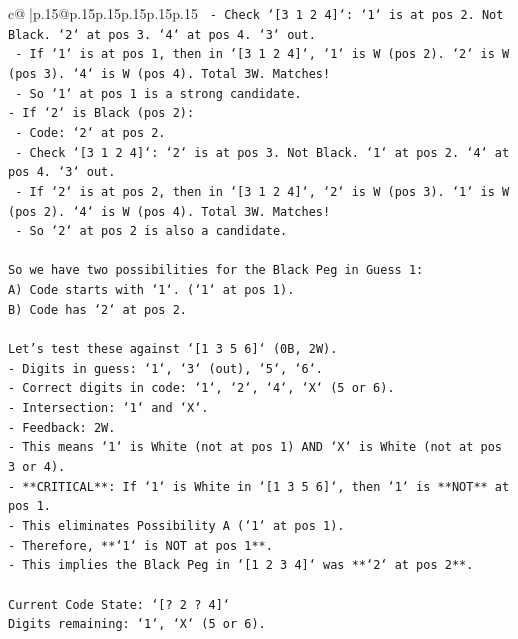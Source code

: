 \documentclass{article}
\begin{document}
{\begin{supertabular}{c@{$\;$}|p{.15\linewidth}@{}p{.15\linewidth}p{.15\linewidth}p{.15\linewidth}p{.15\linewidth}p{.15\linewidth}}
{{{\texttt{    {-} Check `{[}3 1 2 4{]}`: `1` is at pos 2. Not Black. `2` at pos 3. `4` at pos 4. `3` out.} \\
\texttt{    {-} If `1` is at pos 1, then in `{[}3 1 2 4{]}`, `1` is W (pos 2). `2` is W (pos 3). `4` is W (pos 4). Total 3W. Matches!} \\
\texttt{    {-} So `1` at pos 1 is a strong candidate.} \\
\texttt{{-} If `2` is Black (pos 2):} \\
\texttt{    {-} Code: `2` at pos 2.} \\
\texttt{    {-} Check `{[}3 1 2 4{]}`: `2` is at pos 3. Not Black. `1` at pos 2. `4` at pos 4. `3` out.} \\
\texttt{    {-} If `2` is at pos 2, then in `{[}3 1 2 4{]}`, `2` is W (pos 3). `1` is W (pos 2). `4` is W (pos 4). Total 3W. Matches!} \\
\texttt{    {-} So `2` at pos 2 is also a candidate.} \\
\\ 
\texttt{So we have two possibilities for the Black Peg in Guess 1:} \\
\texttt{A) Code starts with `1`. (`1` at pos 1).} \\
\texttt{B) Code has `2` at pos 2.} \\
\\ 
\texttt{Let's test these against `{[}1 3 5 6{]}` (0B, 2W).} \\
\texttt{{-} Digits in guess: `1`, `3` (out), `5`, `6`.} \\
\texttt{{-} Correct digits in code: `1`, `2`, `4`, `X` (5 or 6).} \\
\texttt{{-} Intersection: `1` and `X`.} \\
\texttt{{-} Feedback: 2W.} \\
\texttt{{-} This means `1` is White (not at pos 1) AND `X` is White (not at pos 3 or 4).} \\
\texttt{{-} **CRITICAL**: If `1` is White in `{[}1 3 5 6{]}`, then `1` is **NOT** at pos 1.} \\
\texttt{{-} This eliminates Possibility A (`1` at pos 1).} \\
\texttt{{-} Therefore, **`1` is NOT at pos 1**.} \\
\texttt{{-} This implies the Black Peg in `{[}1 2 3 4{]}` was **`2` at pos 2**.} \\
\\ 
\texttt{Current Code State: `{[}? 2 ? 4{]}`} \\
\texttt{Digits remaining: `1`, `X` (5 or 6).} \\
}}}
\end{supertabular}}
\end{document}
